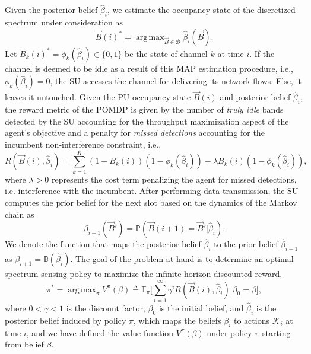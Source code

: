 \documentclass[10pt,twocolumn]{IEEEtran}
\DeclareMathOperator*{\argmax}{arg\,max}
\begin{document}
Given the posterior belief $\hat{\beta}_i$, we estimate the occupancy state of the discretized spectrum under consideration as
\begin{equation}
    \vec{B}(i)^{*} = \argmax_{\vec{B} {\in} \mathcal{B}} \hat{\beta}_{i}(\vec{B}).
\end{equation}
Let $B_{k}(i)^{*} = \phi_{k}(\hat{\beta}_{i}) {\in} \{0, 1\}$ be the state of channel $k$ at time $i$. If the channel is deemed to be idle as a result of this MAP estimation procedure, i.e., $\phi_{k}(\hat{\beta}_{i}) = 0$, the SU accesses the channel for delivering its network flows. Else, it leaves it untouched. Given the PU occupancy state $\vec{B}(i)$ and posterior belief $\hat\beta_i$, the reward metric of the POMDP is given by the number of \emph{truly idle} bands detected by the SU accounting for the throughput maximization aspect of the agent's objective and a penalty for \emph{missed detections} accounting for the incumbent non-interference constraint, i.e.,
\begin{equation}\label{12}
    R(\vec{B}(i), \hat{\beta}_i) = \sum_{k=1}^{K} (1 - B_k(i))(1 - \phi_k(\hat{\beta}_{i})) - \lambda B_k(i)(1 - \phi_k(\hat{\beta}_i)),
\end{equation}
where $\lambda > 0$ represents the cost term penalizing the agent for missed detections, i.e. interference with the incumbent. After performing data transmission, the SU computes the prior belief for the next slot based on the dynamics of the Markov chain as
\begin{equation}\label{13}
    \beta_{i+1}(\vec{B}') = \mathbb{P}(\vec{B}(i+1) = \vec{B}'|\hat{\beta}_{i}).
\end{equation}
We denote the function that maps the posterior belief $\hat\beta_i$ to the prior belief $\hat\beta_{i+1}$ as $\beta_{i+1}={\mathbb B}(\hat\beta_i)$.
The goal of the problem at hand is to determine an optimal spectrum sensing policy to maximize the infinite-horizon discounted reward,
\begin{equation}\label{14}
    \pi^{*} = \argmax_{\pi} V^{\pi}(\beta) \triangleq \mathbb{E}_{\pi} \Big[\sum_{i=1}^{\infty} \gamma^{i} R(\vec{B}(i), \hat{\beta}_i)|\beta_0 = \beta\Big],
\end{equation}
where $0 < \gamma < 1$ is the discount factor, $\beta_0$ is the initial belief, and $\hat\beta_i$ is the posterior belief induced by policy $\pi$, which maps the beliefs $\beta_i$ to actions $\mathcal{K}_i$ at time $i$, and we have defined the value function $V^{\pi}(\beta)$ under policy $\pi$ starting from belief $\beta$.
\end{document}
